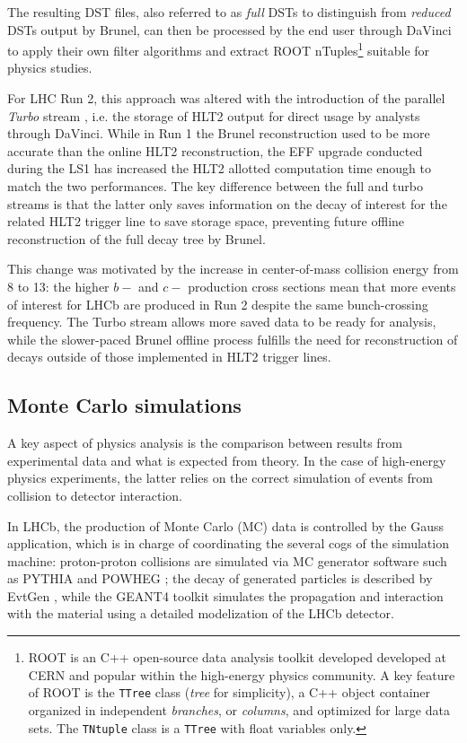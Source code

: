 The resulting DST files, also referred to as \textit{full} DSTs to distinguish from \textit{reduced} DSTs output by Brunel, can then be processed by the end user through DaVinci to apply their own filter algorithms and extract ROOT nTuples\footnote{ROOT \cite{ANTCHEVA20092499} is an C++ open-source data analysis toolkit developed developed at CERN and popular within the high-energy physics community. A key feature of ROOT is the \texttt{TTree} class (\textit{tree} for simplicity), a C++ object container organized in independent \textit{branches}, or \textit{columns}, and optimized for large data sets. The \texttt{TNtuple} class is a \texttt{TTree} with float variables only.} suitable for physics studies.

For LHC Run 2, this approach was altered with the introduction of the parallel \textit{Turbo} stream \cite{Benson_2015}, i.e. the storage of HLT2 output for direct usage by analysts through DaVinci.
While in Run 1 the Brunel reconstruction used to be more accurate than the online HLT2 reconstruction, the EFF upgrade conducted during the LS1 has increased the HLT2 allotted computation time enough to match the two performances.
The key difference between the full and turbo streams is that the latter only saves information on the decay of interest for the related HLT2 trigger line to save storage space, preventing future offline reconstruction of the full decay tree by Brunel.

This change was motivated by the increase in center-of-mass collision energy from \SI{8}{\tev} to \SI{13}{\tev}: the higher $b-$ and $c-$ production cross sections mean that more events of interest for LHCb are produced in Run 2 despite the same bunch-crossing frequency.
The Turbo stream allows more saved data to be ready for analysis, while the slower-paced Brunel offline process fulfills the need for reconstruction of decays outside of those implemented in HLT2 trigger lines.

\subsection{Monte Carlo simulations}
A key aspect of physics analysis is the comparison between results from experimental data and what is expected from theory.
In the case of high-energy physics experiments, the latter relies on the correct simulation of events from collision to detector interaction.

In LHCb, the production of Monte Carlo (MC) data is controlled by the Gauss application, which is in charge of coordinating the several cogs of the simulation machine:
proton-proton collisions are simulated via MC generator software such as PYTHIA \cite{Pythia2015} and POWHEG \cite{Alioli:2010xd}; the decay of generated particles is described by EvtGen \cite{Ryd:2005zz}, while the GEANT4 toolkit \cite{AGOSTINELLI2003250} simulates the propagation and interaction with the material using a detailed modelization of the LHCb detector.

